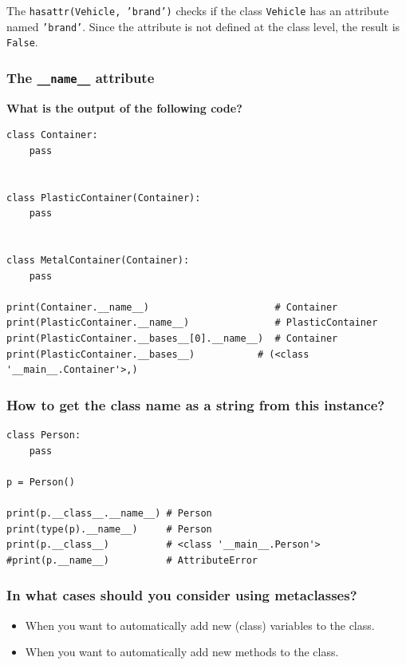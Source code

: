 The \texttt{hasattr(Vehicle, 'brand')} checks if the class \texttt{Vehicle} has an attribute named \texttt{'brand'}. Since the attribute is not defined at the class level, the result is \texttt{False}.


\subsubsection{The \texttt{\_\_name\_\_} attribute}
\textbf{What is the output of the following code?}
\begin{codebox}
\begin{verbatim}
class Container:
    pass
 

class PlasticContainer(Container):
    pass
 

class MetalContainer(Container):
    pass
 
print(Container.__name__)                      # Container
print(PlasticContainer.__name__)               # PlasticContainer
print(PlasticContainer.__bases__[0].__name__)  # Container
print(PlasticContainer.__bases__)           # (<class '__main__.Container'>,)
\end{verbatim}
\end{codebox}

\newpage
\subsubsection{How to get the class name as a string from this instance?}
\begin{codebox}
\begin{verbatim}
class Person:
    pass

p = Person()

print(p.__class__.__name__) # Person
print(type(p).__name__)     # Person
print(p.__class__)          # <class '__main__.Person'>
#print(p.__name__)          # AttributeError
\end{verbatim}
\end{codebox}

\subsubsection{In what cases should you consider using metaclasses?}
\begin{itemize}
\item When you want to automatically add new (class) variables to the class.
\item When you want to automatically add new methods to the class.
\end{itemize}

